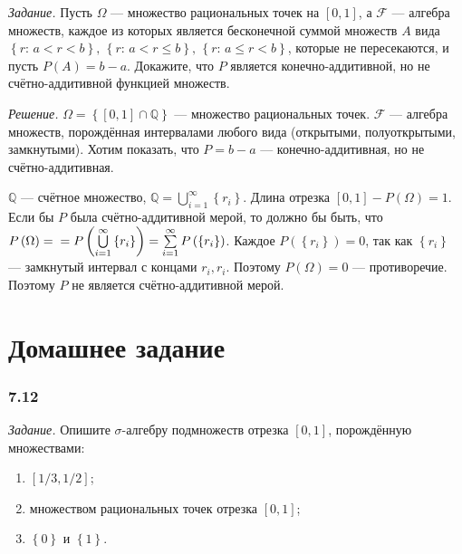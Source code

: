 \textit{Задание.} Пусть $ \Omega $ --- множество рациональных точек на $ \left[ 0, 1 \right] $, а $ \mathcal{F} $ ---
алгебра множеств,
каждое из которых является бесконечной суммой множеств $A$ вида
$ \left\{ r: \, a < r < b \right\}, \,
\left\{ r: \, a < r \leq b \right\}, \,
\left\{ r: \, a \leq r < b \right\} $,
которые не пересекаются, и пусть $P \left( A \right) = b - a$.
Докажите, что $P$ является конечно-аддитивной, но не счётно-аддитивной функцией множеств.

\textit{Решение.} $ \Omega = \left\{ \left[ 0, 1 \right] \cap \mathbb{Q} \right\} $ --- множество рациональных точек.
$ \mathcal{F} $ --- алгебра множеств, порождённая интервалами любого вида (открытыми, полуоткрытыми, замкнутыми).
Хотим показать, что $P = b - a$ --- конечно-аддитивная, но не счётно-аддитивная.

$ \mathbb{Q} $ --- счётное множество, $ \mathbb{Q} = \bigcup \limits_{i=1}^{ \infty } \left\{ r_i \right\} $.
Длина отрезка $ \left[ 0, 1 \right] - P \left( \Omega \right) = 1$.
Если бы $P$ была счётно-аддитивной мерой, то должно бы быть,
что
$P \left( \Omega \right) = \\
= P \left( \bigcup \limits_{i=1}^{ \infty } \left\{ r_i \right\} \right) =
\sum \limits_{i=1}^{ \infty } P \left( \left\{ r_i \right\} \right) $.
Каждое $P \left( \left\{ r_i \right\} \right) = 0$, так как $ \left\{ r_i \right\} $ --- замкнутый интервал с концами $r_i, r_i$.
Поэтому $P \left( \Omega \right) = 0$ --- противоречие.
Поэтому $P$ не является счётно-аддитивной мерой.

\section*{Домашнее задание}

\subsubsection*{7.12}

\textit{Задание.} Опишите $ \sigma $-алгебру подмножеств отрезка $ \left[ 0, 1 \right] $, порождённую множествами:
\begin{enumerate}[label=\alph*)]
\item $ \left[ 1/3, 1/2 \right] $;
\item множеством рациональных точек отрезка $ \left[ 0, 1 \right] $;
\item $ \left\{ 0 \right\} $ и $ \left\{ 1 \right\} $.
\end{enumerate}

